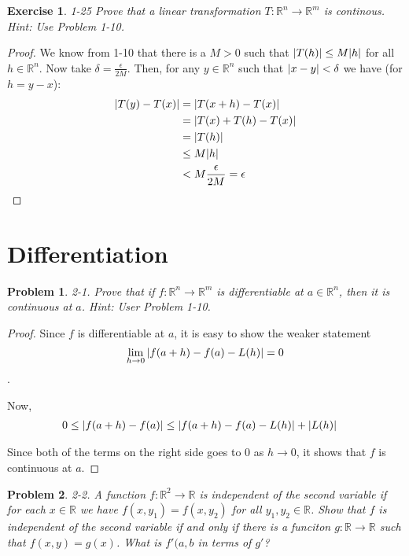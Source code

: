 \documentclass[12pt]{book}
\newtheorem*{problem*}{Problem}
\newtheorem*{exercise*}{Exercise}
\begin{document}
\begin{exercise*}
  1-25 Prove that a linear transformation $T : \mathbb{R}^n \to \mathbb{R}^m$ is continous. Hint: Use Problem 1-10.
\end{exercise*}

\begin{proof}
  We know from 1-10 that there is a $M > 0$ such that $\abs{T(h)} \le M\abs{h}$ for all $h \in \mathbb{R}^n$. Now take $\delta = \frac{\epsilon}{2M}$. Then, for any $y \in \mathbb{R}^n$ such that $\abs{x -y } < \delta$ we have (for $h = y-x$):
  \begin{align*}
    \abs{T(y) - T(x)} &= \abs{T(x+h) - T(x)}\\
    &= \abs{T(x) + T(h) - T(x)} \\
    &= \abs{T(h)}\\
    & \le M\abs{h}\\
    & < M \frac{\epsilon}{2M} = \epsilon
  \end{align*}
\end{proof}

\section{Differentiation}
\begin{problem*}
  2-1. Prove that if $f : \mathbb{R}^n \to \mathbb{R}^m$ is differentiable at $a \in \mathbb{R}^n$, then it is continuous at $a$. Hint: User Problem 1-10. 
\end{problem*}

\begin{proof}
  Since $f$ is differentiable at $a$, it is easy to show the weaker statement
  \[
  \lim_{h\to 0} \abs{f(a+h) - f(a) - L(h)}  = 0
  \].

  Now,
  \begin{align*}
    0 \le \abs{f(a+h) - f(a) } & \le \abs{f(a+h) - f(a) - L(h)} + \abs{L(h)}
  \end{align*}

  Since both of the terms on the right side goes to $0$ as $h \to 0$, it shows that $f$ is continuous at $a$. 
\end{proof}

\begin{problem*}
  2-2. A function $f : \mathbb{R}^2 \to \mathbb{R}$ is independent of the second variable if for each $x \in \mathbb{R}$ we have $f(x, y_1) = f(x, y_2)$ for all $y_1, y_2 \in \mathbb{R}$. Show that $f$ is independent of the second variable if and only if there is a funciton $g : \mathbb{R} \to \mathbb{R}$ such that $f(x, y) = g(x)$. What is $f'(a,b$ in terms of $g'$?
\end{problem*}
\end{document}
